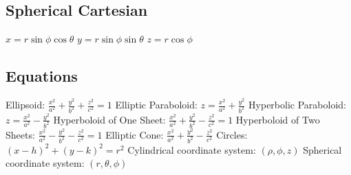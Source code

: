 \documentclass[12pt]{article}
\begin{document}
\begin{paracol}{2}
        \subsection*{Spherical \guillemotright Cartesian}
        $x = r \sin\phi \cos \theta$ \newline
        $y = r \sin\phi \sin \theta$    \newline
        $z = r \cos\phi$

        \subsection*{Equations}
        \begin{fleqn}
            Ellipsoid: $\frac{x^2}{a^2} + \frac{y^2}{b^2} + \frac{z^2}{c^2} = 1 $ \newline
            Elliptic Paraboloid: $z=\frac{x^2}{a^2}+\frac{y^2}{b^2}$ \newline
            Hyperbolic Paraboloid: $z=\frac{x^2}{a^2}-\frac{y^2}{b^2}$ \newline
            Hyperboloid of One Sheet: $\frac{x^2}{a^2} + \frac{y^2}{b^2} - \frac{z^2}{c^2} = 1 $ \newline
            Hyperboloid of Two Sheets: $\frac{x^2}{a^2} - \frac{y^2}{b^2} - \frac{z^2}{c^2} = 1 $ \newline
            Elliptic Cone: $\frac{x^2}{a^2}+\frac{y^2}{b^2}-\frac{z^2}{c^2}$ \newline
            Circles: $(x-h)^2 + (y-k)^2 = r^2$ \newline
            Cylindrical coordinate system: $(\rho,\phi,z)$ \newline
            Spherical coordinate system: $(r,\theta,\phi)$

        \end{fleqn}

\end{paracol}
\end{document}
